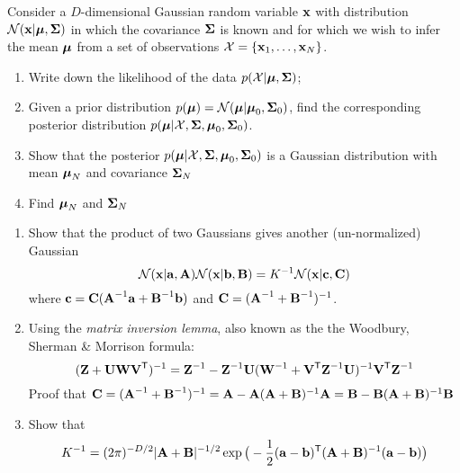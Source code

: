 \documentclass{../amsml}
\begin{document}
\begin{problem}
Consider a $D$-dimensional Gaussian random variable $\bm{\mathbf{x}}$ with distribution $\mathcal{N}(\bm{\mathbf{x}}|\bm{\mathbf{\mu}},\bm{\mathbf{\Sigma}})$ in which the covariance $\bm{\mathbf{\Sigma}}$ is known and for which we wish to infer the mean $\bm{\mathbf{\mu}}$ from a set of observations $\mathcal{X}=\{\bm{\mathbf{x}}_1,\dotsc,\bm{\mathbf{x}}_N\}$. 
\begin{enumerate}
\item Write down the likelihood of the data $p(\mathcal{X}|\bm{\mathbf{\mu}},\bm{\mathbf{\Sigma}})$;
\item Given a prior distribution $p(\bm{\mathbf{\mu}})=\mathcal{N}(\bm{\mathbf{\mu}}|\bm{\mathbf{\mu}}_0,\bm{\mathbf{\Sigma}}_0)$, find the corresponding posterior distribution $p(\bm{\mathbf{\mu}}|\mathcal{X},\bm{\mathbf{\Sigma}},\bm{\mathbf{\mu}}_0,\bm{\mathbf{\Sigma}}_0)$.
\item Show that the posterior $p(\bm{\mathbf{\mu}}|\mathcal{X},\bm{\mathbf{\Sigma}},\bm{\mathbf{\mu}}_0,\bm{\mathbf{\Sigma}}_0)$ is a Gaussian distribution with mean $\bm{\mathbf{\mu}}_N$ and covariance $\bm{\mathbf{\Sigma}}_N$
\item Find $\bm{\mathbf{\mu}}_N$ and $\bm{\mathbf{\Sigma}}_N$
\end{enumerate}
\end{problem}
\begin{problem}

\begin{enumerate}
\item Show that the product of two Gaussians gives another (un-normalized) Gaussian
$$
\mathcal{N}(\bm{\mathbf{x}}|\bm{\mathbf{a}},\bm{\mathbf{A}})\mathcal{N}(\bm{\mathbf{x}}|\bm{\mathbf{b}},\bm{\mathbf{B}}) = K^{-1}\mathcal{N}(\bm{\mathbf{x}}|\bm{\mathbf{c}},\bm{\mathbf{C}})
$$
where $\bm{\mathbf{c}}=\bm{\mathbf{C}}(\bm{\mathbf{A}}^{-1}\bm{\mathbf{a}} + \bm{\mathbf{B}}^{-1}\bm{\mathbf{b}})$ and $\bm{\mathbf{C}}=(\bm{\mathbf{A}}^{-1}+\bm{\mathbf{B}}^{-1})^{-1}$.
\item Using the \emph{matrix inversion lemma}, also known as the the Woodbury, Sherman \& Morrison formula: 
\begin{equation}
(\bm{\mathbf{Z}}+\bm{\mathbf{U}}\bm{\mathbf{W}}\bm{\mathbf{V}}^{\mathsf{T}})^{-1} = \bm{\mathbf{Z}}^{-1} - \bm{\mathbf{Z}}^{-1}\bm{\mathbf{U}}(\bm{\mathbf{W}}^{-1}+\bm{\mathbf{V}}^{\mathsf{T}} \bm{\mathbf{Z}}^{-1}\bm{\mathbf{U}})^{-1}\bm{\mathbf{V}}^{\mathsf{T}} \bm{\mathbf{Z}}^{-1}
\end{equation}
Proof that $\bm{\mathbf{C}} = (\bm{\mathbf{A}}^{-1}+\bm{\mathbf{B}}^{-1})^{-1}=\bm{\mathbf{A}} - \bm{\mathbf{A}}(\bm{\mathbf{A}}+\bm{\mathbf{B}})^{-1}\bm{\mathbf{A}} = \bm{\mathbf{B}} - \bm{\mathbf{B}}(\bm{\mathbf{A}}+\bm{\mathbf{B}})^{-1}\bm{\mathbf{B}}$

\item Show that
\begin{equation}
K^{-1} = (2\pi)^{-D/2}|\bm{\mathbf{A}}+\bm{\mathbf{B}}|^{-1/2} \exp\big( -\frac{1}{2}(\bm{\mathbf{a}}-\bm{\mathbf{b}})^{\mathsf{T}} (\bm{\mathbf{A}}+\bm{\mathbf{B}})^{-1} (\bm{\mathbf{a}}-\bm{\mathbf{b}})\big)
\end{equation}
\end{enumerate}
\end{problem}
\end{document}
